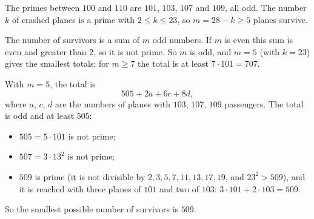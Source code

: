 The primes between $100$ and $110$ are $101$, $103$, $107$ and $109$, all odd. The number $k$ of crashed planes is a prime with $2\le k\le23$, so $m=28-k\ge5$ planes survive.

The number of survivors is a sum of $m$ odd numbers. If $m$ is even this sum is even and greater than $2$, so it is not prime. So $m$ is odd, and $m=5$ (with $k=23$) gives the smallest totals; for $m\ge7$ the total is at least $7\cdot101=707$.

With $m=5$, the total is
\[505+2a+6c+8d,\]
where $a$, $c$, $d$ are the numbers of planes with $103$, $107$, $109$ passengers. The total is odd and at least $505$:
\begin{itemize}
\item $505=5\cdot101$ is not prime;
\item $507=3\cdot13^2$ is not prime;
\item $509$ is prime (it is not divisible by $2,3,5,7,11,13,17,19$, and $23^2>509$), and it is reached with three planes of $101$ and two of $103$: $3\cdot101+2\cdot103=509$.
\end{itemize}
So the smallest possible number of survivors is $\boxed{509}$.
